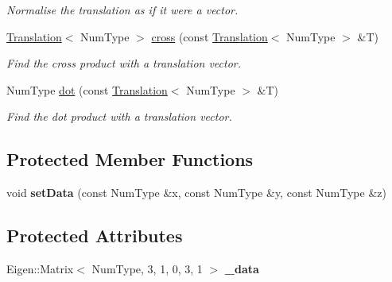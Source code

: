 \begin{DoxyCompactItemize}
\begin{DoxyCompactList}\small\item\em Normalise the translation as if it were a vector. \end{DoxyCompactList}\item 
\hyperlink{singletonscrews_1_1_translation}{Translation}$<$ Num\+Type $>$ \hyperlink{singletonscrews_1_1_translation_a152488edb2b4de6b1161e0247fad6b17}{cross} (const \hyperlink{singletonscrews_1_1_translation}{Translation}$<$ Num\+Type $>$ \&T)
\begin{DoxyCompactList}\small\item\em Find the cross product with a translation vector. \end{DoxyCompactList}\item 
Num\+Type \hyperlink{singletonscrews_1_1_translation_ab2edaccfa53a4d771138a723a75a3982}{dot} (const \hyperlink{singletonscrews_1_1_translation}{Translation}$<$ Num\+Type $>$ \&T)
\begin{DoxyCompactList}\small\item\em Find the dot product with a translation vector. \end{DoxyCompactList}\end{DoxyCompactItemize}
\subsection*{Protected Member Functions}
\begin{DoxyCompactItemize}
\item 
\hypertarget{singletonscrews_1_1_translation_a1ea0211a48b09fa9688cd6943f6c5693}{void {\bfseries set\+Data} (const Num\+Type \&x, const Num\+Type \&y, const Num\+Type \&z)}\label{singletonscrews_1_1_translation_a1ea0211a48b09fa9688cd6943f6c5693}

\end{DoxyCompactItemize}
\subsection*{Protected Attributes}
\begin{DoxyCompactItemize}
\item 
\hypertarget{singletonscrews_1_1_translation_a9964ce9f57a11d43e0852aa23f9f223e}{Eigen\+::\+Matrix$<$ Num\+Type, 3, 1, 0, 3, 1 $>$ {\bfseries \+\_\+data}}\label{singletonscrews_1_1_translation_a9964ce9f57a11d43e0852aa23f9f223e}

\end{DoxyCompactItemize}
